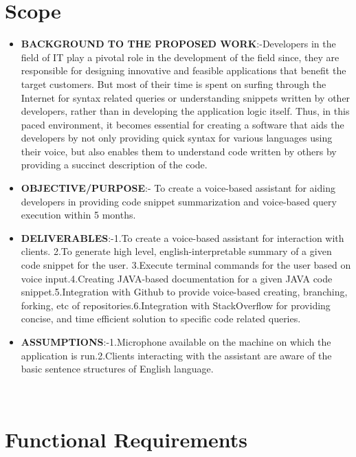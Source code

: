 \documentclass[oneside,a4paper,12pt, times]{book}
\begin{document}
\section{Scope}
\begin{itemize}
\item \textbf{BACKGROUND TO THE PROPOSED WORK}:-\newline Developers in the field of IT play a pivotal role in the development of the field since, they are responsible for designing innovative and feasible applications that benefit the target customers. But most of their time is spent on surfing through the Internet for syntax related queries or understanding snippets written by other developers, rather than in developing the application logic itself. Thus, in this paced environment, it becomes essential for creating a software that aids the developers by not only providing quick syntax for various languages using their voice, but also enables them to understand code written by others by providing a succinct description of the code. 
\item \textbf{OBJECTIVE/PURPOSE}:- \newline To create a voice-based assistant for aiding developers in providing code snippet summarization and voice-based query execution within 5 months.   
\item \textbf{DELIVERABLES}:-\newline1.To create a voice-based assistant for interaction with clients. \newline2.To generate high level, english-interpretable summary of a given code snippet for the user. \newline3.Execute terminal commands for the user based on voice input.\newline4.Creating JAVA-based documentation for a given JAVA code snippet.\newline5.Integration with Github to provide voice-based creating, branching, forking, etc of repositories.\newline 6.Integration with StackOverflow for providing concise, and time efficient solution to specific code related queries.
\item \textbf{ASSUMPTIONS}:-\newline1.Microphone available on the machine on which the application is run.\newline2.Clients interacting with the assistant are aware of the basic sentence structures of English language.
\end{itemize}
\\



\section{Functional Requirements}  
\end{document}
